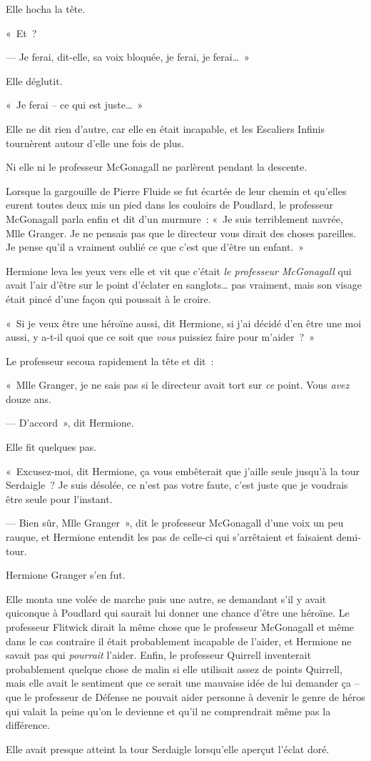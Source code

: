 Elle hocha la tête.

«~Et~?

--- Je ferai, dit-elle, sa voix bloquée, je ferai, je ferai…~»

Elle déglutit.

«~Je ferai -- ce qui est juste…~»

Elle ne dit rien d'autre, car elle en était incapable, et les Escaliers Infinis tournèrent autour d'elle une fois de plus.

Ni elle ni le professeur McGonagall ne parlèrent pendant la descente.

Lorsque la gargouille de Pierre Fluide se fut écartée de leur chemin et qu'elles eurent toutes deux mis un pied dans les couloirs de Poudlard, le professeur McGonagall parla enfin et dit d'un murmure~: «~Je suis terriblement navrée, Mlle Granger.
Je ne pensais pas que le directeur vous dirait des choses pareilles.
Je pense qu'il a vraiment oublié ce que c'est que d'être un enfant.~»

Hermione leva les yeux vers elle et vit que c'était \emph{le professeur McGonagall} qui avait l'air d'être sur le point d'éclater en sanglots… pas vraiment, mais son visage était pincé d'une façon qui poussait à le croire.

«~Si je veux être une héroïne aussi, dit Hermione, si j'ai décidé d'en être une moi aussi, y a-t-il quoi que ce soit que \emph{vous} puissiez faire pour m'aider~?~»

Le professeur secoua rapidement la tête et dit~:

«~Mlle Granger, je ne sais pas si le directeur avait tort sur \emph{ce} point.
Vous \emph{avez} douze ans.

--- D'accord~», dit Hermione.

Elle fit quelques pas.

«~Excusez-moi, dit Hermione, ça vous embêterait que j'aille seule jusqu'à la tour Serdaigle~?
Je suis désolée, ce n'est pas votre faute, c'est juste que je voudrais être seule pour l'instant.

--- Bien sûr, Mlle Granger~», dit le professeur McGonagall d'une voix un peu rauque, et Hermione entendit les pas de celle-ci qui s'arrêtaient et faisaient demi-tour.

Hermione Granger s'en fut.

Elle monta une volée de marche puis une autre, se demandant s'il y avait quiconque à Poudlard qui saurait lui donner une chance d'être une héroïne.
Le professeur Flitwick dirait la même chose que le professeur McGonagall et même dans le cas contraire il était probablement incapable de l'aider, et Hermione ne savait pas qui \emph{pourrait} l'aider.
Enfin, le professeur Quirrell inventerait probablement quelque chose de malin si elle utilisait assez de points Quirrell, mais elle avait le sentiment que ce serait une mauvaise idée de lui demander ça -- que le professeur de Défense ne pouvait aider personne à devenir le genre de héros qui valait la peine qu'on le devienne et qu'il ne comprendrait même pas la différence.

Elle avait presque atteint la tour Serdaigle lorsqu'elle aperçut l'éclat doré.
